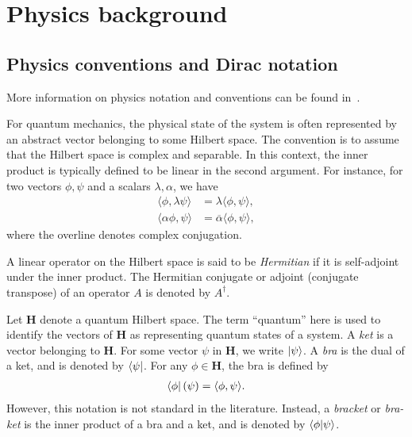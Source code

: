 \chapter{Physics background}\label{ch:physics_background}

\section{Physics conventions and Dirac notation}\label{sec:basics}

More information on physics notation and conventions can be found in~\cite{Hall2013,Griffiths2018,Tung1985,Zwiebach2022}.

For quantum mechanics, the physical state of the system is often represented by an abstract vector belonging to some Hilbert space. The convention is to assume that the Hilbert space is complex and separable. In this context, the inner product is typically defined to be linear in the second argument. For instance, for two vectors $\phi,\psi$ and a scalars $\lambda,\alpha$, we have
\begin{align}
    \langle \phi,\lambda\psi\rangle&=\lambda\langle \phi,\psi\rangle, \\
    \langle \alpha\phi,\psi\rangle&=\overline{\alpha}\langle \phi,\psi\rangle,
\end{align}
where the overline denotes complex conjugation.

A linear operator on the Hilbert space is said to be \textit{Hermitian} if it is self-adjoint under the inner product. The Hermitian conjugate or adjoint (conjugate transpose) of an operator $A$ is denoted by $A^\dagger$.

Let $\mathbf{H}$ denote a quantum Hilbert space. The term ``quantum'' here is used to identify the vectors of $\mathbf{H}$ as representing quantum states of a system. A \textit{ket} is a vector belonging to $\mathbf{H}$. For some vector $\psi$ in $\mathbf{H}$, we write $\ket{\psi}$. A \textit{bra} is the dual of a ket, and is denoted by $\bra{\psi}$. For any $\phi\in \mathbf{H}$, the bra is defined by
\begin{align}
    \bra{\phi}(\psi) = \langle \phi,\psi\rangle.
\end{align}
However, this notation is not standard in the literature. Instead, a \textit{bracket} or \textit{bra-ket} is the inner product of a bra and a ket, and is denoted by $\braket{\phi|\psi}$.

